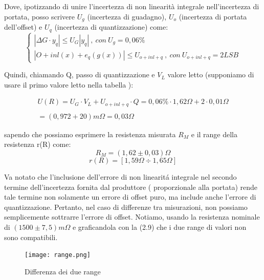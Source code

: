 Dove, ipotizzando di unire l'incertezza di non linearità integrale nell'incertezza di portata, posso scrivere $U_g$ (incertezza di guadagno), $U_o$ (incertezza di portata dell'offset) e $U_q$ (incertezza di quantizzazione) come: 
\begin{equation}
\left\{\begin{array}{l}
    | \Delta G \cdot y_q | \leq U_G |y_q| \ , \ con \ U_g=0,06\% \\
| O + inl(x) + e_q(g(x)) | \leq U_{o+inl+q} \ , \ con \ U_{o+inl+q}=2LSB
\end{array}\right.
\end{equation}

Quindi, chiamando Q, passo di quantizzazione e $V_L$ valore letto (supponiamo di usare il primo valore letto nella tabella \label{mult_port}):

\begin{equation*}
\begin{array}{l}
U(R) = U_G \cdot V_L + U_{o+inl+q} \cdot Q = 0,06\% \cdot 1,62\Omega + 2 \cdot 0,01 \Omega \\ \\
= (0,972 + 20) m\Omega = 0,03 \Omega
\end{array}
\end{equation*}

sapendo che possiamo esprimere la resistenza misurata $R_M$ e il range della resistenza r(R) come:
\begin{equation*}
    R_M = (1,62 \pm 0,03) \Omega
\end{equation*}
\begin{equation*}
    r(R) = [1,59 \Omega \div 1,65 \Omega]
\end{equation*}

Va notato che l'inclusione dell'errore di non linearit\'a integrale nel secondo termine dell'incertezza fornita dal produttore ( proporzionale alla portata) rende tale termine non solamente un errore di offset puro, ma include anche l'errore di quantizzazione. Pertanto, nel caso di differenze tra misurazioni, non possiamo semplicemente sottrarre l'errore di offset.
Notiamo, usando la resistenza nominale di $(1500 \pm 7,5) m\Omega$ e graficandola con la (2.9) che i due range di valori non sono compatibili.

\begin{figure}[h]
    \centering
    \texttt{[image: range.png]}
    \caption{Differenza dei due range}
    \label{fig:range}
\end{figure}
\FloatBarrier

